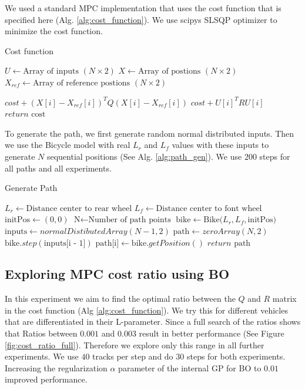 \documentclass[twoside,twocolumn]{article}
\begin{document}
We used a standard MPC implementation that uses the cost function that is specified here (Alg. \ref{alg:cost_function}). We use scipys SLSQP optimizer to minimize the cost function.
\begin{algorithm}
    \caption{Cost function}
    \label{alg:cost_function}
    \begin{algorithmic}
        \State $U \gets \text{Array of inputs } (N \times 2)$
        \State $X \gets \text{Array of postions } (N \times 2)$
        \State $X_{ref} \gets \text{Array of reference postions } (N \times 2)$

            \State $cost + (X[i] - X_{ref}[i])^T Q (X[i] - X_{ref}[i])$
            \State $cost + U[i]^T R U[i]$
        \EndFor
        \State $return \text{ cost}$
    \end{algorithmic}
\end{algorithm}

To generate the path, we first generate random normal distributed inputs. Then we use the Bicycle model with real $L_r$ and $L_f$ values with these inputs to generate $N$ sequential positions (See Alg. \ref{alg:path_gen}). We use $200$ steps for all paths and all experiments.
\begin{algorithm}
    \caption{Generate Path}
    \label{alg:path_gen}
    \begin{algorithmic}
        \State $L_r \gets \text{Distance center to rear wheel}$
        \State $L_f \gets \text{Distance center to font wheel}$
        \State $\text{initPos} \gets (0,0)$
        \State $\text{N} \gets \text{Number of path points}$
        \State $\text{bike} \gets \text{Bike(}L_r, L_f, \text{initPos}\text{)}$
        \State $\text{inputs} \gets normalDistibutedArray(N - 1, 2)$
        \State $\text{path} \gets zeroArray(N, 2)$
            \State $\text{bike}.step(\text{inputs[i - 1]})$
            \State $\text{path[i]} \gets \text{bike}.getPosition()$
        \EndFor
        \State $return \text{ path}$
    \end{algorithmic}
\end{algorithm}

\subsection{Exploring MPC cost ratio using BO}

In this experiment we aim to find the optimal ratio between the $Q$ and $R$ matrix in the cost function (Alg \ref{alg:cost_function}). We try this for different vehicles that are differentiated in their L-parameter. Since a full search of the ratios shows that Ratios between $0.001$ and $0.003$ result in better performance (See Figure \ref{fig:cost_ratio_full}). Therefore we explore only this range in all further experiments. We use $40$ tracks per step and do $30$ steps for both experiments. Increasing the regularization $\alpha$ parameter of the internal GP for BO to $0.01$ improved performance.
\end{document}
